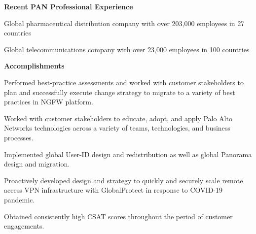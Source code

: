 \documentclass{article}
\begin{document}
	{\Large\bfseries Recent PAN Professional Experience}
	
	Global pharmaceutical distribution company with over 203,000 employees in 27 countries
	
	\vspace{0.1in}
	
	Global telecommunications company with over 23,000 employees in 100 countries
	
	\vspace{0.2in}
	
	{\Large\bfseries Accomplishments}
	
	Performed best-practice assessments and worked with customer stakeholders to plan and successfully execute change strategy to migrate to a variety of best 
	practices in NGFW platform.
	
	Worked with customer stakeholders to educate, adopt, and apply Palo Alto Networks technologies across a variety of teams, technologies, and business processes.
	
	Implemented global User-ID design and redistribution as well as global Panorama design and migration.
	
	Proactively developed design and strategy to quickly and securely scale remote access VPN infrastructure with GlobalProtect in response to COVID-19 pandemic.
	
	Obtained consistently high CSAT scores throughout the period of customer engagements.
	
	\endgroup
	
\end{document}
